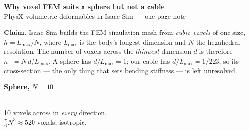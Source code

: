 \documentclass[10pt,a4paper]{article}
\newcommand{\panel}[1]{{\small\bfseries #1}}
\begin{document}
\begin{center}
{\Large\bfseries Why voxel FEM suits a sphere but not a cable}\\[2pt]
{\small PhysX volumetric deformables in Isaac Sim --- one-page note}
\end{center}

\textbf{Claim.} Isaac Sim builds the FEM simulation mesh from \emph{cubic voxels}
of one size, $h = L_{\max}/N$, where $L_{\max}$ is the body's longest dimension and
$N$ the hexahedral resolution. The number of voxels across the \emph{thinnest}
dimension $d$ is therefore $n_\perp = N\,d/L_{\max}$.
A sphere has $d/L_{\max}=1$; our cable has $d/L_{\max}=1/223$, so its cross-section
--- the only thing that sets bending stiffness --- is left unresolved.

\vspace{2pt}
\begin{minipage}[t]{0.30\linewidth}
\centering
\panel{\textcolor{good}{Sphere, $N=10$}}\\[3pt]
\\[2pt]
{\footnotesize 10 voxels across in \emph{every} direction.\\
$\tfrac{\pi}{6}N^3 \approx 520$ voxels, isotropic.}
\end{minipage}\hfill
\end{document}
